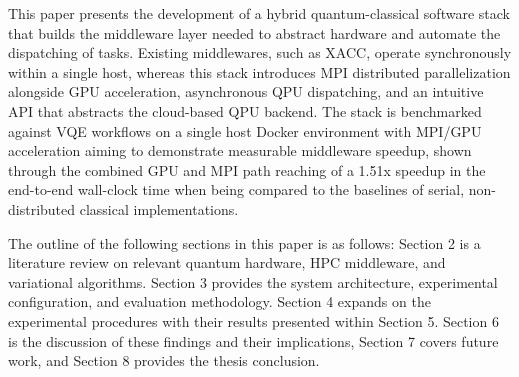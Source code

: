    This paper presents the development of a hybrid quantum-classical software stack that builds the middleware layer needed
    to abstract hardware and automate the dispatching of tasks. Existing middlewares, such as XACC, operate synchronously within a single host, whereas this stack introduces MPI distributed parallelization alongside 
    GPU acceleration, asynchronous QPU dispatching, and an intuitive API that abstracts the cloud-based QPU backend. The stack is benchmarked against VQE workflows 
    on a single host Docker environment with MPI/GPU acceleration aiming to demonstrate measurable middleware speedup, shown through the combined GPU and MPI path reaching of a 1.51x 
    speedup in the end-to-end wall-clock time when being compared to the baselines of serial, non-distributed classical implementations. 

    The outline of the following sections in this paper is as follows: Section 2 is a literature review on relevant quantum hardware, HPC middleware, and variational algorithms. Section 3
    provides the system architecture, experimental configuration, and evaluation methodology. Section 4 expands on the experimental procedures with their results presented within Section 5. 
    Section 6 is the discussion of these findings and their implications, Section 7 covers future work, and Section 8 provides the thesis conclusion. 